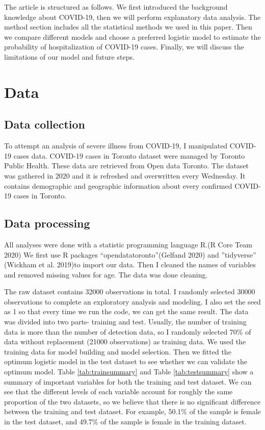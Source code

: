\documentclass[
]{article}
\begin{document}
The article is structured as follows. We first introduced the background knowledge about COVID-19, then we will perform explanatory data analysis. The method section includes all the statistical methods we used in this paper. Then we compare different models and choose a preferred logistic model to estimate the probability of hospitalization of COVID-19 cases. Finally, we will discuss the limitations of our model and future steps.

\hypertarget{data}{%
\section{Data}\label{data}}

\hypertarget{data-collection}{%
\subsection{Data collection}\label{data-collection}}

To attempt an analysis of severe illness from COVID-19, I manipulated COVID-19 cases data. COVID-19 cases in Toronto dataset were managed by Toronto Public Health. These data are retrieved from Open data Toronto. The dataset was gathered in 2020 and it is refreshed and overwritten every Wednesday. It contains demographic and geographic information about every confirmed COVID-19 cases in Toronto.

\hypertarget{data-processing}{%
\subsection{Data processing}\label{data-processing}}

All analyses were done with a statistic programming language R.(R Core Team 2020) We first use R packages ``opendatatoronto''(Gelfand 2020) and ''tidyverse'' (Wickham et al. 2019)to import our data. Then I cleaned the names of variables and removed missing values for age. The data was done cleaning.

The raw dataset contains 32000 observations in total. I randomly selected 30000 observations to complete an exploratory analysis and modeling. I also set the seed as 1 so that every time we run the code, we can get the same result. The data was divided into two parts- training and test. Usually, the number of training data is more than the number of detection data, so I randomly selected 70\% of data without replacement (21000 observations) as training data. We used the training data for model building and model selection. Then we fitted the optimum logistic model in the test dataset to see whether we can validate the optimum model. Table \ref{tab:trainsummary} and Table \ref{tab:testsummary} show a summary of important variables for both the training and test dataset. We can see that the different levels of each variable account for roughly the same proportion of the two datasets, so we believe that there is no significant difference between the training and test dataset. For example, 50.1\% of the sample is female in the test dataset, and 49.7\% of the sample is female in the training dataset.
\end{document}
